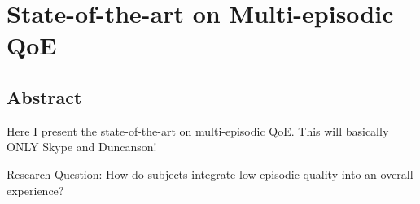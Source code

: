 \chapter{State-of-the-art on Multi-episodic QoE}\label{chap:05}

\section*{Abstract}
Here I present the state-of-the-art on multi-episodic QoE.
This will basically ONLY Skype and Duncanson!

Research Question: How do subjects integrate low episodic quality into an overall experience?
